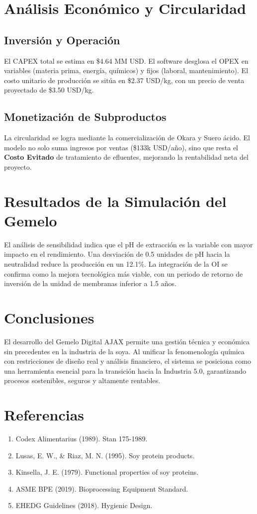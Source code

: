 \documentclass[12pt,a4paper,twocolumn]{article}
\begin{document}
\section{Análisis Económico y Circularidad}

\subsection{Inversión y Operación}
El CAPEX total se estima en \$4.64 MM USD. El software desglosa el OPEX en variables (materia prima, energía, químicos) y fijos (laboral, mantenimiento). El costo unitario de producción se sitúa en \$2.37 USD/kg, con un precio de venta proyectado de \$3.50 USD/kg.

\subsection{Monetización de Subproductos}
La circularidad se logra mediante la comercialización de Okara y Suero ácido. El modelo no solo suma ingresos por ventas (\$133k USD/año), sino que resta el \textbf{Costo Evitado} de tratamiento de efluentes, mejorando la rentabilidad neta del proyecto.

\section{Resultados de la Simulación del Gemelo}
El análisis de sensibilidad indica que el pH de extracción es la variable con mayor impacto en el rendimiento. Una desviación de 0.5 unidades de pH hacia la neutralidad reduce la producción en un 12.1\%. La integración de la OI se confirma como la mejora tecnológica más viable, con un periodo de retorno de inversión de la unidad de membranas inferior a 1.5 años.

\section{Conclusiones}
El desarrollo del Gemelo Digital AJAX permite una gestión técnica y económica sin precedentes en la industria de la soya. Al unificar la fenomenología química con restricciones de diseño real y análisis financiero, el sistema se posiciona como una herramienta esencial para la transición hacia la Industria 5.0, garantizando procesos sostenibles, seguros y altamente rentables.

\section*{Referencias}
\begin{enumerate}
    \item Codex Alimentarius (1989). Stan 175-1989.
    \item Lusas, E. W., \& Riaz, M. N. (1995). Soy protein products.
    \item Kinsella, J. E. (1979). Functional properties of soy proteins.
    \item ASME BPE (2019). Bioprocessing Equipment Standard.
    \item EHEDG Guidelines (2018). Hygienic Design.
\end{enumerate}
\end{document}
